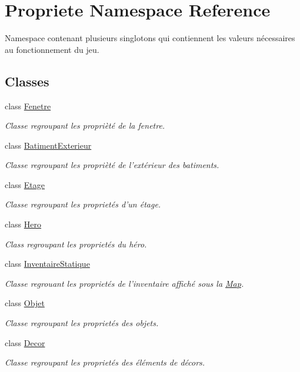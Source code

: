 \hypertarget{namespacePropriete}{\section{Propriete Namespace Reference}
\label{namespacePropriete}
}


Namespace contenant plusieurs singlotons qui contiennent les valeurs nécessaires au fonctionnement du jeu.  


\subsection*{Classes}
\begin{DoxyCompactItemize}
\item 
class \hyperlink{classPropriete_1_1Fenetre}{Fenetre}
\begin{DoxyCompactList}\small\item\em Classe regroupant les proprièté de la fenetre. \end{DoxyCompactList}\item 
class \hyperlink{classPropriete_1_1BatimentExterieur}{Batiment\-Exterieur}
\begin{DoxyCompactList}\small\item\em Classe regroupant les proprièté de l'extérieur des batiments. \end{DoxyCompactList}\item 
class \hyperlink{classPropriete_1_1Etage}{Etage}
\begin{DoxyCompactList}\small\item\em Classe regroupant les proprietés d'un étage. \end{DoxyCompactList}\item 
class \hyperlink{classPropriete_1_1Hero}{Hero}
\begin{DoxyCompactList}\small\item\em Class regroupant les proprietés du héro. \end{DoxyCompactList}\item 
class \hyperlink{classPropriete_1_1InventaireStatique}{Inventaire\-Statique}
\begin{DoxyCompactList}\small\item\em Classe regrouant les proprietés de l'inventaire affiché sous la \hyperlink{classMap}{Map}. \end{DoxyCompactList}\item 
class \hyperlink{classPropriete_1_1Objet}{Objet}
\begin{DoxyCompactList}\small\item\em Classe regroupant les proprietés des objets. \end{DoxyCompactList}\item 
class \hyperlink{classPropriete_1_1Decor}{Decor}
\begin{DoxyCompactList}\small\item\em Classe regroupant les proprietés des éléments de décors. \end{DoxyCompactList}\end{DoxyCompactItemize}
